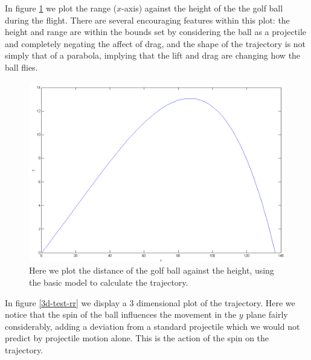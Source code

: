 In figure \ref{2d-test-rr} we plot the range ($x$-axis) against the height of the the golf ball during
the flight. There are several encouraging features within this plot: the height and range are within
the bounds set by considering the ball as a projectile and completely negating the affect of drag, and
the shape of the trajectory is not simply that of a parabola, implying that the lift and drag are changing how
the ball flies.
\begin{figure}[h]
\centering
\includegraphics[scale=0.37]{../images/rr_traj_basic.png}
\caption[2D plot of an example Robinson and Robinson model trajectory]{Here we plot the distance of the
golf ball against the height, using the basic \citeauthor*{Robinson2013} model to calculate the trajectory.}
\label{2d-test-rr}
\end{figure}

In figure \ref{3d-test-rr} we display a 3 dimensional plot of the trajectory. Here we notice that 
the spin of the ball influences the movement in the $y$ plane fairly considerably, adding a deviation
from a standard projectile which we would not predict by projectile motion alone. This is the action
of the spin on the trajectory.

